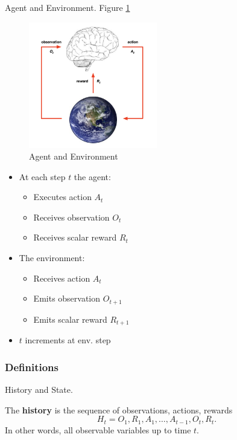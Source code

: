 \documentclass[english]{article}
\begin{document}
\item {Agent and Environment}. Figure \ref{Agent and Environment}
    \begin{figure}
        \centering
        \includegraphics[width=0.5\textwidth]{RL.png}
        \caption{Agent and Environment}
        \label{Agent and Environment}
    \end{figure}
  
 
\begin{itemize}
    \item At each step $t$ the agent:
    \begin{itemize}
        \item Executes action $A_t$
        \item Receives observation $O_t$
        \item Receives scalar reward $R_t$
    \end{itemize}
    \item The environment:
    \begin{itemize}
        \item Receives action $A_t$
        \item Emits observation $O_{t+1}$
        \item Emits scalar reward $R_{t+1}$
    \end{itemize}
    \item $t$ increments at env. step
\end{itemize}

 
\eenum

\subsubsection{Definitions}
\benum

\item {History and State}.
\begin{definition}[History]
The \textbf{history} is the sequence of observations, actions, rewards
\[ H_t = O_1, R_1, A_1, \dots, A_{t-1}, O_t, R_t. \]
In other words, all observable variables up to time $t$.
\end{definition}
\end{document}
